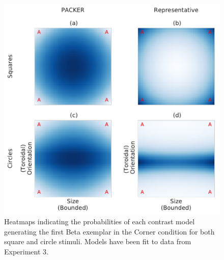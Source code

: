 \documentclass[pdflatex,sn-apa]{sn-jnl}%
\theoremstyle{thmstyleone}%
\theoremstyle{thmstyletwo}%
\theoremstyle{thmstylethree}%
\begin{document}


\begin{figure}
    \begin{center}
      \includegraphics[width=.6\textwidth]{figs/e3-firstbetas.pdf}
      \caption{Heatmaps indicating the probabilities of each contrast model
        generating the first Beta exemplar in the Corner condition for both
        square and circle stimuli. Models have been fit to data from Experiment 3.}
    \label{fig:e3-firstbetas}
    \end{center}
\end{figure}
\end{document}
